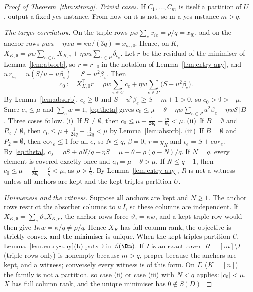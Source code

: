 \begin{proof}[Proof of Theorem~\ref{thm:strong}]
\emph{Trivial cases.} If $C_1,\dots,C_m$ is itself a partition of $U$, output a fixed yes-instance. From now on it is not, so in a yes-instance $m>q$.

\emph{The target correlation.} On the triple rows $\rho w\sum_ex_{ie}=\rho/q=x_{i0}$, and on the anchor rows $\rho wu+\eta wu=\kappa u/(3q)=x_{a_e,0}$. Hence, on $K$, $X_{K,0}=\rho w\sum_{e\in U}X_{K,e}+\eta wu\sum_{e\in P}\delta_{a_e}$. Let $r$ be the residual of the minimiser of Lemma~\ref{lem:absorb}, so $r=r_{-0}$ in the notation of Lemma~\ref{lem:entry-any}, and $u\,r_{a_e}=u(S/u-u\beta_e)=S-u^2\beta_e$. Then
\[
c_0:=X_{K,0}^{\top}r=\rho w\sum_{e\in U}c_e+\eta w\sum_{e\in P}\bigl(S-u^2\beta_e\bigr).
\]
By Lemma~\ref{lem:absorb}, $c_e\ge0$ and $S-u^2\beta_e\ge S-m+1>0$, so $c_0>0>-\mu$. Since $c_e\le\mu$ and $\sum_ew=1$, \eqref{eq:theta} gives $c_0\le\mu+\theta-\eta w\sum_{e\in P}u^2\beta_e-\eta wS\,|B|$. Three cases follow.
(i)~If $B\ne\emptyset$, then $c_0\le\mu+\frac1{24q}-\frac{m}{6q}<\mu$.
(ii)~If $B=\emptyset$ and $P_2\ne\emptyset$, then $c_0\le\mu+\frac1{24q}-\frac1{12q}<\mu$ by Lemma~\ref{lem:absorb}.
(iii)~If $B=\emptyset$ and $P_2=\emptyset$, then $\mathrm{cov}_e\le1$ for all $e$, so $N\le q$, $\beta=0$, $r=y_K$ and $c_e=S+\mathrm{cov}_e$. By~\eqref{eq:theta}, $c_0=\rho S+\rho N/q+\eta S=\mu+\theta-\rho(q-N)/q$. If $N=q$, every element is covered exactly once and $c_0=\mu+\theta>\mu$. If $N\le q-1$, then $c_0\le\mu+\frac1{24q}-\frac\rho q<\mu$, as $\rho>\frac12$.
By Lemma~\ref{lem:entry-any}, $R$ is not a witness unless all anchors are kept and the kept triples partition $U$.

\emph{Uniqueness and the witness.} Suppose all anchors are kept and $N\ge1$. The anchor rows restrict the absorber columns to $u\,I$, so these columns are independent. If $X_{K,0}=\sum_e\vartheta_eX_{K,e}$, the anchor rows force $\vartheta_e=\kappa w$, and a kept triple row would then give $3\kappa w=\kappa/q\ne\rho/q$. Hence $X_K$ has full column rank, the objective is strictly convex and the minimiser is unique. When the kept triples partition $U$, Lemma~\ref{lem:entry-any}(b) puts $0$ in $S(\Dm)$. If $I$ is an exact cover, $R=[m]\setminus I$ (triple rows only) is nonempty because $m>q$, proper because the anchors are kept, and a witness; conversely every witness is of this form. On $D$ ($K=[n]$) the family is not a partition, so case (ii) or case (iii) with $N<q$ applies: $\lvert c_0\rvert<\mu$, $X$ has full column rank, and the unique minimiser has $0\notin S(D)$.


\end{proof}
